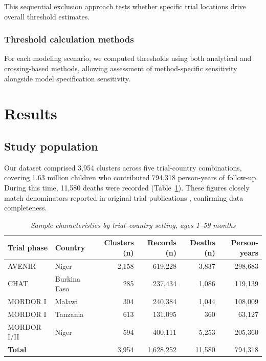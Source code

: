 \documentclass[11pt]{article}\usepackage[]{graphicx}\usepackage[]{xcolor}
\begin{document}
This sequential exclusion approach tests whether specific trial locations drive overall threshold estimates.

\subsubsection{Threshold calculation methods}

For each modeling scenario, we computed thresholds using both analytical and crossing-based methods, allowing assessment of method-specific sensitivity alongside model specification sensitivity.

\section{Results}

\subsection{Study population}

Our dataset comprised 3,954 clusters across five trial-country combinations, covering 1.63 million children who contributed 794,318 person-years of follow-up. During this time, 11,580 deaths were recorded (Table~\ref{tab:analysis-sample}). These figures closely match denominators reported in original trial publications \citep{keenan2018nejm, oldenburg2024jama, o2024azithromycin}, confirming data completeness.

\linespread{1.2}
\begin{table}[!h]
\centering
\caption{\emph{Sample characteristics by trial--country setting, ages 1--59 months}}
\label{tab:analysis-sample}
\begin{tabular}{l l r r r r}
\toprule
Trial phase & Country & Clusters (n) & Records (n) & Deaths (n) & Person-years \\
\midrule
AVENIR      & Niger        & 2,158 & 619,228 & 3,837 & 298,683 \\
CHAT        & Burkina Faso &   285 & 237,434 & 1,086 & 119,139 \\
MORDOR I    & Malawi       &   304 & 240,384 & 1,044 & 108,009 \\
MORDOR I    & Tanzania     &   613 & 131,095 &   360 &  63,127 \\
MORDOR I/II & Niger        &   594 & 400,111 & 5,253 & 205,360 \\
\midrule
\textbf{Total} &            & 3,954 & 1,628,252 & 11,580 & 794,318 \\
\bottomrule
\end{tabular}
\end{table}
\linespread{1.5}
\end{document}
